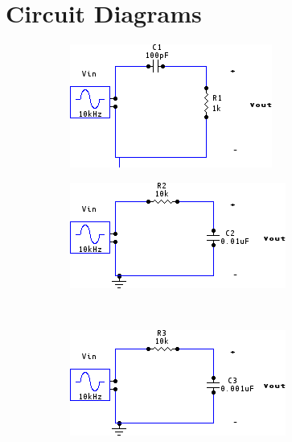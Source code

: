 \documentclass[a4paper,10pt]{report}
\begin{document}
	\section{Circuit Diagrams}
	\noindent\begin{figure}
		\null\hfill
		\begin{subfigure}{.5\linewidth}
			\centering
			\includegraphics[width=.9\linewidth]{./Circuits/Differentiator.png}
			\caption{}
			\label{fig:sub1}
		\end{subfigure}%
		\hfill
		\begin{subfigure}{.5\linewidth}
			\centering
			\includegraphics[width=.9\linewidth]{./Circuits/Integrator.png}
			\caption{}
			\label{fig:sub2}
		\end{subfigure}\hfill\null\\[1ex]\null\hfill
		\begin{subfigure}{.5\linewidth}
			\centering
			\includegraphics[width=.9\linewidth]{./Circuits/LowPassFilter.png}

\end{subfigure}
\end{figure}
\end{document}
